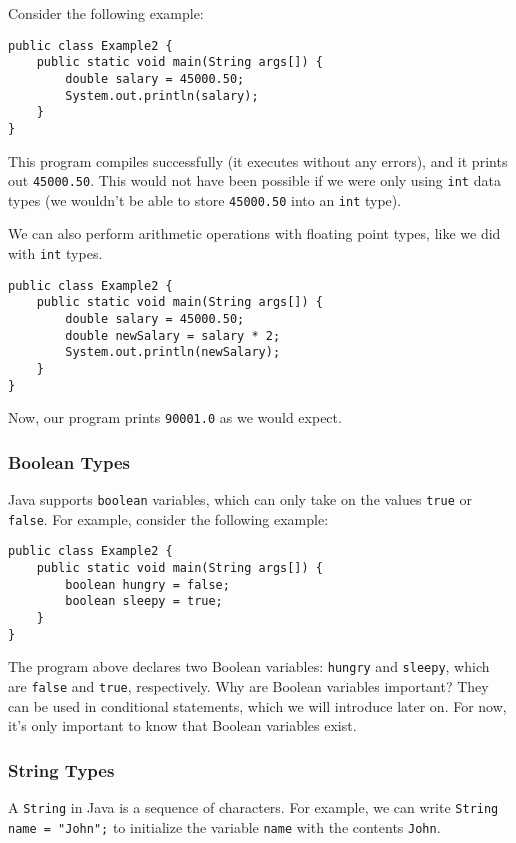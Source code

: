 Consider the following example:

\begin{lstlisting}
public class Example2 {
    public static void main(String args[]) {
        double salary = 45000.50;
        System.out.println(salary);
    }
}
\end{lstlisting}

This program compiles successfully (it executes without any errors), and it prints out \verb!45000.50!. This would not have been possible if we were only using \verb!int! data types (we wouldn't be able to store \verb!45000.50! into an \verb!int! type). 


We can also perform arithmetic operations with floating point types, like we did with \verb!int! types.


\begin{lstlisting}
public class Example2 {
    public static void main(String args[]) {
        double salary = 45000.50;
        double newSalary = salary * 2;
        System.out.println(newSalary);
    }
}
\end{lstlisting}

Now, our program prints \verb!90001.0! as we would expect.

\subsubsection{Boolean Types}

Java supports \verb!boolean! variables, which can only take on the values \verb!true! or \verb!false!. For example, consider the following example:

\begin{lstlisting}
public class Example2 {
    public static void main(String args[]) {
        boolean hungry = false;
        boolean sleepy = true;
    }
}
\end{lstlisting}

The program above declares two Boolean variables: \verb!hungry! and \verb!sleepy!, which are \verb!false! and \verb!true!, respectively. Why are Boolean variables important? They can be used in conditional statements, which we will introduce later on. For now, it's only important to know that Boolean variables exist. 

\subsubsection{String Types}

A \verb!String! in Java is a sequence of characters. For example, we can write \verb!String name = "John";! to initialize the variable \verb!name! with the contents \verb!John!. \\

